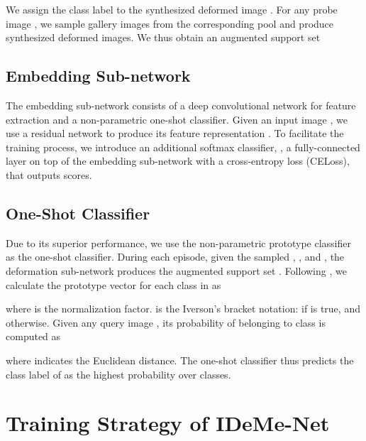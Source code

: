 \documentclass[10pt,letterpaper,twocolumn]{article}
\begin{document}
\noindent 


We assign
the class label  to the synthesized deformed image .\textcolor{red}{{}
}For any probe image , we sample 
gallery images from the corresponding pool and produce  synthesized
deformed images. We thus
obtain an augmented support set 
\noindent 





\subsection{Embedding Sub-network }
The embedding sub-network 
consists of a deep convolutional network for feature extraction and
a non-parametric one-shot classifier.
Given an input image , we use a residual network \cite{he2015deep}
to produce its feature representation .
To facilitate the training process, we introduce an additional softmax classifier, \ie, a fully-connected
layer on top of the embedding sub-network with a cross-entropy loss
(CELoss), that outputs  scores. 

\subsection{One-Shot Classifier}

Due to its superior performance, we use the non-parametric prototype
classifier \cite{prototype_network} as the one-shot classifier. During
each episode, given the sampled , , and , the deformation
sub-network produces the augmented support set . Following
\cite{prototype_network}, we calculate the prototype vector 
for each class  in  as



\noindent where 
is the normalization factor. 
is the Iverson's bracket notation: 
if  is true, and  otherwise. Given any query image ,
its probability of belonging to class  is computed as

\noindent 


\noindent where  indicates the Euclidean
distance. The one-shot classifier  thus predicts the class label of
 as the highest probability over  classes.

\section{Training Strategy of IDeMe-Net}
\end{document}
